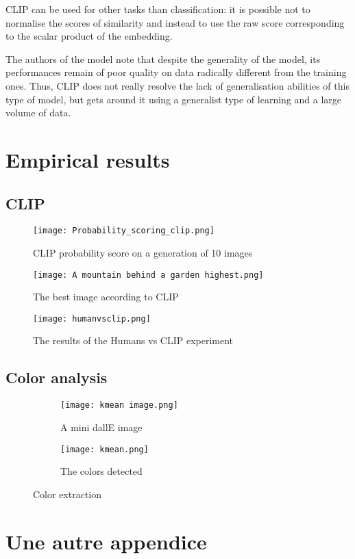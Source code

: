 \documentclass{article}
\begin{document}
\begin{appendix}
CLIP can be used for other tasks than classification: it is possible not to normalise the scores of similarity and instead to use the raw score corresponding to the scalar product of the embedding. 

The authors of the model note that despite the generality of the model, its performances remain of poor quality on data radically different from the training ones. Thus, CLIP does not really resolve the lack of generalisation abilities of this type of model, but gets around it using a generalist type of learning and a large volume of data. 

\section{Empirical results}

\subsection{CLIP}

\begin{figure}[H]
    \centering
    \texttt{[image: Probability\_scoring\_clip.png]}
    \caption{CLIP probability score on a generation of 10 images}
    \label{fig:clip_proba_exemple}
\end{figure}

\begin{figure}[H]
    \centering
    \texttt{[image: A mountain behind a garden highest.png]}
    \caption{The best image according to CLIP}
    \label{fig:clip_image_exemple}
\end{figure}

\begin{figure}[H]
    \centering
    \texttt{[image: humanvsclip.png]}
    \caption{The results of the Humans vs CLIP experiment}
    \label{fig:Humans vs CLIP}
\end{figure}


\subsection{Color analysis}

\begin{figure}[H]
\begin{subfigure}{.5\textwidth}
  \centering
  \texttt{[image: kmean image.png]}
  \caption{A mini dallE image}
  \label{fig:sfig_kmean_image}
\end{subfigure}%
\begin{subfigure}{.5\textwidth}
  \centering
  \texttt{[image: kmean.png]}
  \caption{The colors detected}
  \label{fig:sfig_kmean}
\end{subfigure}
\caption{Color extraction}
\label{fig:kmean}
\end{figure}





\section{Une autre appendice}

\end{appendix}
\end{document}
